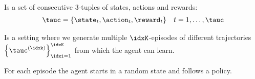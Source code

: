 \begin{defnbox}\nospacing
  \begin{defn}\label{defn:trajectory}\leavevmode\\
    Is a set of consecutive 3-tuples of states, actions and rewards:
    \begin{align}
      \tauc=\left\{\state_{t},\action_{t},\reward_{t}\right\}&&t=1,\ldots,\tauc
    \end{align}
  \end{defn}
\end{defnbox}
\begin{defnbox}\nospacing
  \begin{defn}\label{defn:episodic_learning}
    Is a setting where we generate multiple $\idxK$-episodes of different trajectories
    $\left\{\tauc^{(\idxk)}\right\}_{\idxi=1}^{\idxK}$ from which the agent can learn.
  \end{defn}
\end{defnbox}
\begin{explanationbox}\nospacing
  \begin{explanation}
    For each episode the agent starts in a random state and follows a policy.
  \end{explanation}
\end{explanationbox}

